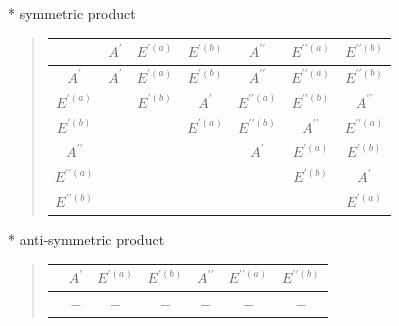\documentclass[fleqn,8pt,landscape]{jsarticle}
\begin{document}
* symmetric product
\begin{quote}
\begin{tabular}{c|cccccc} \hline \hline
 & $ A^{\prime} $ & $ E^{\prime(a)} $ & $ E^{\prime(b)} $ & $ A^{\prime\prime} $ & $ E^{\prime\prime(a)} $ & $ E^{\prime\prime(b)} $ \\ \hline
$ A^{\prime} $ & $ A^{\prime} $ & $ E^{\prime(a)} $ & $ E^{\prime(b)} $ & $ A^{\prime\prime} $ & $ E^{\prime\prime(a)} $ & $ E^{\prime\prime(b)} $ \\
$ E^{\prime(a)} $ & $  $ & $ E^{\prime(b)} $ & $ A^{\prime} $ & $ E^{\prime\prime(a)} $ & $ E^{\prime\prime(b)} $ & $ A^{\prime\prime} $ \\
$ E^{\prime(b)} $ & $  $ & $  $ & $ E^{\prime(a)} $ & $ E^{\prime\prime(b)} $ & $ A^{\prime\prime} $ & $ E^{\prime\prime(a)} $ \\
$ A^{\prime\prime} $ & $  $ & $  $ & $  $ & $ A^{\prime} $ & $ E^{\prime(a)} $ & $ E^{\prime(b)} $ \\
$ E^{\prime\prime(a)} $ & $  $ & $  $ & $  $ & $  $ & $ E^{\prime(b)} $ & $ A^{\prime} $ \\
$ E^{\prime\prime(b)} $ & $  $ & $  $ & $  $ & $  $ & $  $ & $ E^{\prime(a)} $ \\
 \hline \hline
\end{tabular}
\end{quote}

* anti-symmetric product
\begin{quote}
\begin{tabular}{ccccccc} \hline \hline
 & $ A^{\prime} $ & $ E^{\prime(a)} $ & $ E^{\prime(b)} $ & $ A^{\prime\prime} $ & $ E^{\prime\prime(a)} $ & $ E^{\prime\prime(b)} $ \\ \hline
$  $ & $ - $ & $ - $ & $ - $ & $ - $ & $ - $ & $ - $ \\
 \hline \hline
\end{tabular}
\end{quote}
\end{document}
